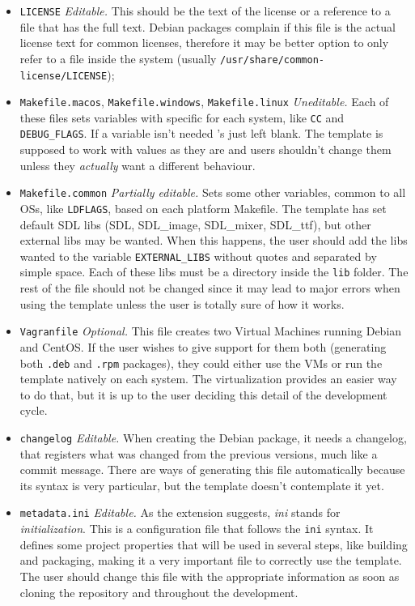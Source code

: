 \begin{itemize}
	\item \texttt{LICENSE} \emph{Editable.} This should be the text of the license or a reference to a file that has the full text. Debian packages complain if this file is the actual license text for common licenses, therefore it may be better option to only refer to a file inside the system (usually \texttt{/usr/share/common-license/LICENSE});
	\item \texttt{Makefile.macos}, \texttt{Makefile.windows}, \texttt{Makefile.linux} \emph{Uneditable.} Each of these files sets variables with specific for each system, like \texttt{CC} and \texttt{DEBUG\_FLAGS}. If a variable isn't needed 's just left blank. The template is supposed to work with values as they are and users shouldn't change them unless they \emph{actually} want a different behaviour.
	\item \texttt{Makefile.common} \emph{Partially editable.} Sets some other variables, common to all OSs, like \texttt{LDFLAGS}, based on each platform Makefile. The template has set default SDL libs (SDL, SDL\_image, SDL\_mixer, SDL\_ttf), but other external libs may be wanted. When this happens, the user should add the libs wanted to the variable \texttt{EXTERNAL\_LIBS} without quotes and separated by simple space. Each of these libs must be a directory inside the \texttt{lib} folder. The rest of the file should not be changed since it may lead to major errors when using the template unless the user is totally sure of how it works.
	\item \texttt{Vagranfile} \emph{Optional.} This file creates two Virtual Machines running Debian and CentOS. If the user wishes to give support for them both (generating both \texttt{.deb} and \texttt{.rpm} packages), they could either use the VMs or run the template natively on each system. The virtualization provides an easier way to do that, but it is up to the user deciding this detail of the development cycle.
	\item \texttt{changelog} \emph{Editable.} When creating the Debian package, it needs a changelog, that registers what was changed from the previous versions, much like a commit message. There are ways of generating this file automatically because its syntax is very particular, but the template doesn't contemplate it yet.
	\item \texttt{metadata.ini} \emph{Editable.} As the extension suggests, \textit{ini} stands for \textit{initialization}. This is a configuration file that follows the \texttt{ini} syntax. It defines some project properties that will be used in several steps, like building and packaging, making it a very important file to correctly use the template. The user should change this file with the appropriate information as soon as cloning the repository and throughout the development.
\end{itemize}


